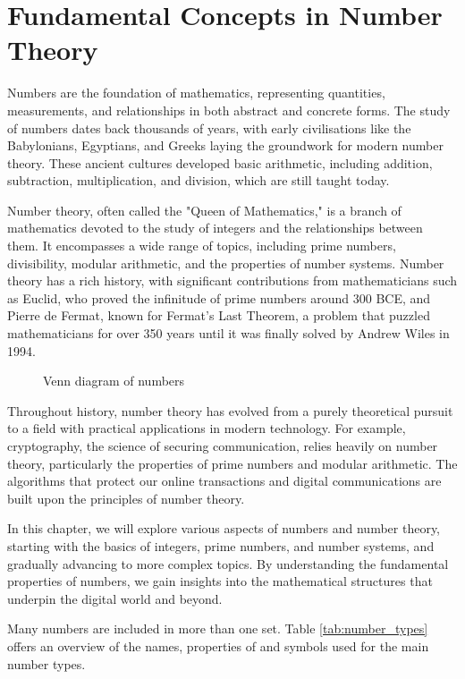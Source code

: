 \chapter{Fundamental Concepts in Number Theory}
\label{chap:ch12}
Numbers are the foundation of mathematics, representing quantities, measurements, and relationships in both abstract and concrete forms. The study of numbers dates back thousands of years, with early civilisations like the Babylonians, Egyptians, and Greeks laying the groundwork for modern number theory. These ancient cultures developed basic arithmetic, including addition, subtraction, multiplication, and division, which are still taught today.

Number theory, often called the "Queen of Mathematics," is a branch of mathematics devoted to the study of integers and the relationships between them. It encompasses a wide range of topics, including prime numbers, divisibility, modular arithmetic, and the properties of number systems. Number theory has a rich history, with significant contributions from mathematicians such as Euclid, who proved the infinitude of prime numbers around 300 BCE, and Pierre de Fermat, known for Fermat's Last Theorem, a problem that puzzled mathematicians for over 350 years until it was finally solved by Andrew Wiles in 1994.

\begin{figure}[h!]
    \centering
    
    \caption{Venn diagram of numbers}
    \label{fig:venn_num2}
\end{figure}

Throughout history, number theory has evolved from a purely theoretical pursuit to a field with practical applications in modern technology. For example, cryptography, the science of securing communication, relies heavily on number theory, particularly the properties of prime numbers and modular arithmetic. The algorithms that protect our online transactions and digital communications are built upon the principles of number theory.

In this chapter, we will explore various aspects of numbers and number theory, starting with the basics of integers, prime numbers, and number systems, and gradually advancing to more complex topics. By understanding the fundamental properties of numbers, we gain insights into the mathematical structures that underpin the digital world and beyond.

\begin{remark}
Many numbers are included in more than one set. Table \ref{tab:number_types} offers an overview of the names, properties of and symbols used for the main number types.
\end{remark}

